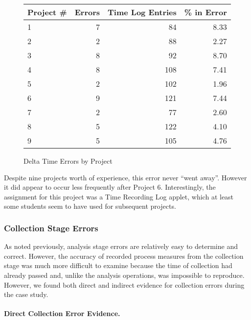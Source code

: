 \begin{figure}
   \begin{center} 
   \begin{tabular}{|l|r|r|r|}\hline 
   Project \#  & Errors & Time Log Entries & \% in Error \\ \hline\hline 
   1  & 7 &  84 &  8.33 \\ \hline 
   2  & 2 &  88 &  2.27 \\ \hline 
   3  & 8 &  92 &  8.70 \\ \hline 
   4  & 8 & 108 &  7.41 \\ \hline  
   5  & 2 & 102 &  1.96 \\ \hline 
   6  & 9 & 121 &  7.44 \\ \hline 
   7  & 2 &  77 &  2.60 \\ \hline 
   8  & 5 & 122 &  4.10 \\ \hline 
   9  & 5 & 105 &  4.76 \\ \hline 
   \end{tabular} \newline \newline
   \end{center} 
   \caption{\label{deltaErrors}Delta Time Errors by Project}
\end{figure}
   
Despite nine projects worth of experience, this error never ``went away''.
However it did appear to occur less frequently after Project 6.
Interestingly, the assignment for this project was a Time Recording Log
applet, which at least some students seem to have used for subsequent
projects.

 
\subsubsection{Collection Stage Errors}

As noted previously, analysis stage errors are relatively easy to determine
and correct. However, the accuracy of recorded process measures from the
collection stage was much more difficult to examine because the time of
collection had already passed and, unlike the analysis operations, was
impossible to reproduce. However, we found both direct and indirect
evidence for collection errors during the case study.

\paragraph{Direct Collection Error Evidence.}

